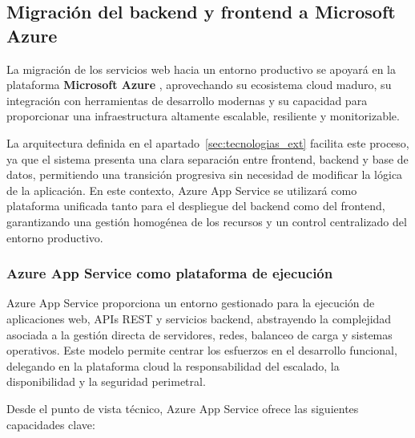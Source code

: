 \subsection{Migración del backend y frontend a Microsoft Azure}
\label{sec:migracion_azure}

La migración de los servicios web hacia un entorno productivo se apoyará en la plataforma \textbf{Microsoft Azure} \cite{azure_docs}, aprovechando su ecosistema cloud maduro, su integración con herramientas de desarrollo modernas y su capacidad para proporcionar una infraestructura altamente escalable, resiliente y monitorizable.

La arquitectura definida en el apartado~\ref{sec:tecnologias_ext} facilita este proceso, ya que el sistema presenta una clara separación entre frontend, backend y base de datos, permitiendo una transición progresiva sin necesidad de modificar la lógica de la aplicación. En este contexto, Azure App Service \cite{azure_app_service_docs} se utilizará como plataforma unificada tanto para el despliegue del backend como del frontend, garantizando una gestión homogénea de los recursos y un control centralizado del entorno productivo.

\subsubsection{Azure App Service como plataforma de ejecución}

Azure App Service proporciona un entorno gestionado para la ejecución de aplicaciones web, APIs REST y servicios backend, abstrayendo la complejidad asociada a la gestión directa de servidores, redes, balanceo de carga y sistemas operativos. Este modelo permite centrar los esfuerzos en el desarrollo funcional, delegando en la plataforma cloud la responsabilidad del escalado, la disponibilidad y la seguridad perimetral.

Desde el punto de vista técnico, Azure App Service ofrece las siguientes capacidades clave:

